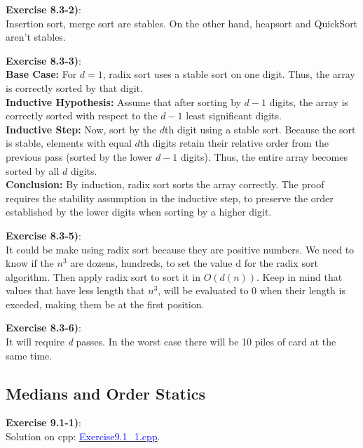 \documentclass{article}
\newcounter{exercise}[section]   %
\begin{document}
\textbf{Exercise 8.3-2)}:\\
Insertion sort, merge sort are stables. On the other hand, heapsort and QuickSort aren't 
stables.

\textbf{Exercise 8.3-3)}:\\
\textbf{Base Case:} For $d=1$, radix sort uses a stable sort on one digit.
Thus, the array is correctly sorted by that digit.\\[1ex]
\textbf{Inductive Hypothesis:} Assume that after sorting by $d-1$ digits,
the array is correctly sorted with respect to the $d-1$ least significant 
digits.\\[1ex]
\textbf{Inductive Step:} Now, sort by the $d$th digit using a stable sort.
Because the sort is stable, elements with equal $d$th digits retain their
relative order from the previous pass (sorted by the lower $d-1$ digits).
Thus, the entire array becomes sorted by all $d$ digits.\\[1ex]
\textbf{Conclusion:} By induction, radix sort sorts the array correctly.
The proof requires the stability assumption in the inductive step,
to preserve the order established by the lower digits when sorting by
a higher digit.

\textbf{Exercise 8.3-5)}:\\
It could be make using radix sort because they are positive numbers. We need to know if
the \(n^3\) are dozens, hundreds, to set the value d for the radix sort algorithm. Then
apply radix sort to sort it in \(O(d(n))\). Keep in mind that values that have less length
that \(n^3\), will be evaluated to 0 when their length is exceded, making them be at the
first position.

\textbf{Exercise 8.3-6)}:\\
It will require \textit{d} passes. In the worst case there will be 10 piles of card at the
same time.

\subsection{Medians and Order Statics}
\setcounter{exercise}{0}

\textbf{Exercise 9.1-1)}:\\
Solution on cpp: \href{https://github.com/Graburr/Algorithms_CLRS_4ed_solutions/blob/main/chapter2/Medians_and_Order_Statics/Exercise9.1_1.cpp}
{\textcolor{Blue}{Exercise9.1\_1.cpp}}.
\end{document}
